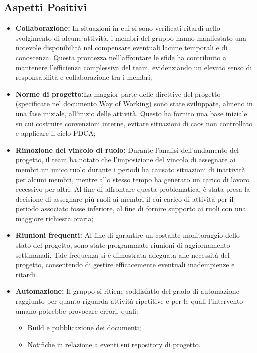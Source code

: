 \subsection{Aspetti Positivi}
\begin{itemize}
    \item \textbf{Collaborazione:} In situazioni in cui si sono verificati ritardi nello svolgimento di alcune attività, i membri del gruppo hanno manifestato una notevole disponibilità nel compensare eventuali lacune temporali e di conoscenza. Questa prontezza nell'affrontare le sfide ha contribuito a mantenere l'efficienza complessiva del team, evidenziando un elevato senso di responsabilità e collaborazione tra i membri;
    \item \textbf{Norme di progetto:}La maggior parte delle direttive del progetto (specificate nel documento Way of Working) sono state sviluppate, almeno in una fase iniziale, all'inizio delle attività. Questo ha fornito una base iniziale su cui costruire convenzioni interne, evitare situazioni di caos non controllato e applicare il ciclo PDCA;
    \item \textbf{Rimozione del vincolo di ruolo:} Durante l'analisi dell'andamento del progetto, il team ha notato che l'imposizione del vincolo di assegnare ai membri un unico ruolo durante i periodi ha causato situazioni di inattività per alcuni membri, mentre allo stesso tempo ha generato un carico di lavoro eccessivo per altri.
    Al fine di affrontare questa problematica, è stata presa la decisione di assegnare più ruoli ai membri il cui carico di attività per il periodo associato fosse inferiore, al fine di fornire supporto ai ruoli con una maggiore richiesta oraria;
    \item \textbf{Riunioni frequenti:} Al fine di garantire un costante monitoraggio dello stato del progetto, sono state programmate riunioni di aggiornamento settimanali. Tale frequenza si è dimostrata adeguata alle necessità del progetto, consentendo di gestire efficacemente eventuali inadempienze e ritardi.
    \item \textbf{Automazione:} Il gruppo si ritiene soddisfatto del grado di automazione raggiunto per quanto riguarda attività ripetitive e per le quali l'intervento umano potrebbe provocare errori, quali:
    \begin{itemize}
        \item Build e pubblicazione dei documenti;
        \item Notifiche in relazione a eventi sui repository di progetto.
    \end{itemize}
\end{itemize}